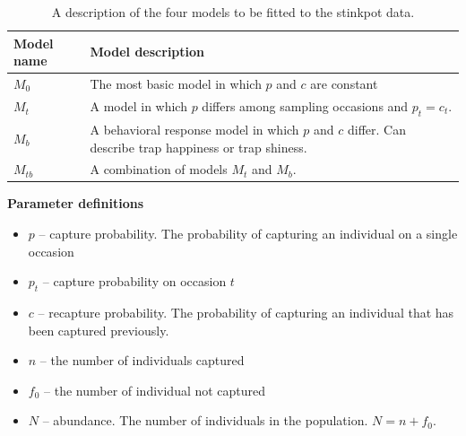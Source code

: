 \documentclass[12pt]{article}\usepackage[]{graphicx}\usepackage[]{color}
\begin{document}
\begin{table}[h!]
  \centering
  \caption{A description of the four models to be fitted to the
    stinkpot data.}
  \footnotesize
  \begin{tabular}[h!]{ll}
    \hline
    Model name & Model description \\
    \hline
    $M_0$ & The most basic model in which $p$ and $c$ are constant \\
    $M_t$ & A model in which $p$ differs among sampling occasions and
            $p_t=c_t$. \\
    $M_b$ & A behavioral response model in which $p$ and $c$
            differ. Can describe trap happiness or trap shiness. \\
    $M_{tb}$ & A combination of models $M_t$ and $M_b$. \\
    \hline
  \end{tabular}
  \label{tab:Otis}
\end{table}





{\bf Parameter definitions}
\begin{itemize}
  \item $p$ -- capture probability. The probability of capturing an
    individual on a single occasion
  \item $p_t$ -- capture probability on occasion $t$
  \item $c$ -- recapture probability. The probability of capturing an
    individual that has been captured previously.
  \item $n$ -- the number of individuals captured
  \item $f_0$ -- the number of individual not captured
  \item $N$ -- abundance. The number of individuals in the
    population. $N=n+f_0$. 
\end{itemize}

\end{document}
